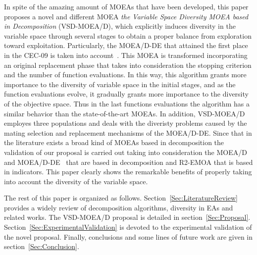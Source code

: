 In spite of the amazing amount of MOEAs that have been developed, this paper proposes a novel and different MOEA \textit{the Variable Space Diversity MOEA based in Decomposition} (VSD-MOEA/D), which explicitly induces diversity in the variable space through several stages to obtain a proper balance from exploration toward exploitation.
%
Particularly, the MOEA/D-DE that attained the first place in the CEC-09 is taken into account~\cite{zhang2009performance}.
%
This MOEA is transformed incorporating an original replacement phase that takes into consideration the stopping criterion and the number of function evaluations.
%
In this way, this algorithm grants more importance to the diversity of variable space in the initial stages, and as the function evaluations evolve, it gradually grants more importance to the diversity of the objective space.
%
Thus in the last functions evaluations the algorithm has a similar behavior than the state-of-the-art MOEAs.
%
In addition, VSD-MOEA/D employes three populations and deals with the diveristy problems caused by the mating selection and replacement mechanisms of the MOEA/D-DE.
%
Since that in the literature exists a broad kind of MOEAs based in decomposition the validation of our proposal is carried out taking into consideration the  MOEA/D~\cite{zhang2007moea} and  MOEA/D-DE~\cite{zhang2009performance} that are based in decomposition and R2-EMOA that is based in indicators.
%
This paper clearly shows the remarkable benefits of properly taking into account the diversity of the variable space.

The rest of this paper is organized as follows.
%
Section~\ref{Sec:LiteratureReview} provides a widely review of decomposition algorithms, diversity in EAs and related works.
%
The VSD-MOEA/D proposal is detailed in section~\ref{Sec:Proposal}.
%
Section~\ref{Sec:ExperimentalValidation} is devoted to the experimental validation of the novel proposal.
%
Finally, conclusions and some lines of future work are given in section~\ref{Sec:Conclusion}.
%
